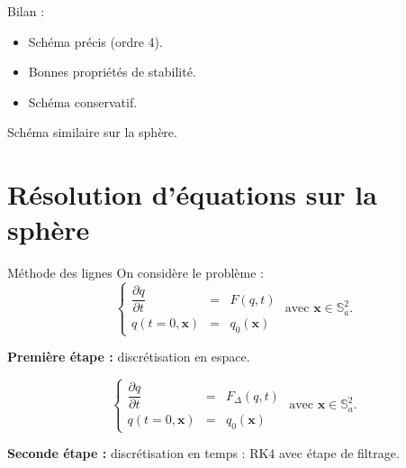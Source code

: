 \documentclass[11pt]{beamer}
\begin{document}
\begin{frame}{}

\begin{block}{Bilan :}
\begin{itemize}
\item Schéma précis (ordre 4).
\item Bonnes propriétés de stabilité.
\item Schéma conservatif.
\end{itemize}
\end{block}

\begin{exampleblock}{}
Schéma similaire sur la sphère.
\end{exampleblock}

\end{frame}






\section{Résolution d'équations sur la sphère}
\begin{frame}{Méthode des lignes}
On considère le problème :
$$
\left\lbrace
\begin{array}{rcl}
\dfrac{\partial q}{\partial t} & = & F(q,t) \\
q(t=0,\mathbf{x}) & = & q_0(\mathbf{x})
\end{array}
\right. \text{ avec } \mathbf{x} \in \mathbb{S}_a^2.
$$
\begin{block}{}
\textbf{Première étape : } discrétisation en espace.
\end{block}
$$
\left\lbrace
\begin{array}{rcl}
\dfrac{\partial q}{\partial t} & = & F_{\Delta}(q,t) \\
q(t=0,\mathbf{x}) & = & q_0(\mathbf{x})
\end{array}
\right. \text{ avec } \mathbf{x} \in \mathbb{S}_a^2.
$$
\begin{block}{}
\textbf{Seconde étape : } discrétisation en temps : RK4 avec étape de filtrage.
\end{block}
\end{frame}
\end{document}
